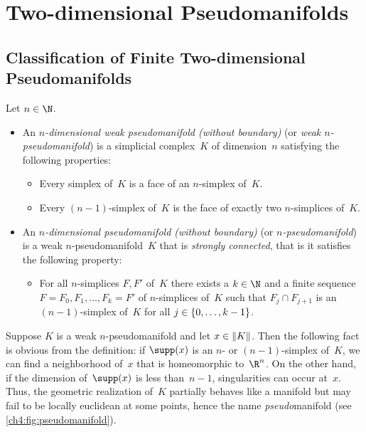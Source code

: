 \chapter{Two-dimensional Pseudomanifolds}
\section{Classification of Finite Two-dimensional Pseudomanifolds}
\begin{thDef}
    \label{ch4:def:pseudomanifold}
    Let $n\in\N$. 
    \begin{itemize}
        \item
            An \emph{$n$-dimensional weak pseudomanifold (without boundary)}
            (or \emph{weak $n$-pseudo\-manifold}) is a simplicial complex~$K$
            of dimension~$n$ satisfying the following properties:
            \begin{itemize}
                \item
                    Every simplex of~$K$ is a face of an $n$-simplex of~$K$.
                \item
                    Every $(n{-}1)$-simplex of~$K$ is the face of exactly two
                    $n$-simplices of~$K$.
            \end{itemize}
            
        \item
            An \emph{$n$-dimensional pseudomanifold (without boundary)} (or
            \emph{$n$-pseudomanifold}) is a weak $n$-pseudomanifold~$K$ that is
            \emph{strongly connected}, that is it satisfies the following
            property:
            \begin{itemize}
                \item
                    For all $n$-simplices $F,F'$ of~$K$ there exists a $k\in\N$ and a
                    finite sequence $F=F_0,F_1,\dots,F_k=F'$ of $n$-simplices of~$K$
                    such that  $F_j\cap F_{j+1}$ is an $(n{-}1)$-simplex of~$K$ 
                    for all $j\in\{0,\ldots,k-1\}$.
            \end{itemize}
    \end{itemize}
\end{thDef}

Suppose $K$ is a weak $n$-pseudomanifold and let $x\in\lVert K\rVert$.
Then the following fact is obvious from the definition:
if $\supp(x)$ is an $n$- or $(n{-}1)$-simplex of~$K$,
we can find a neighborhood of~$x$ that is homeomorphic
to~$\R^n$. On the other hand, if the dimension of~$\supp(x)$
is less than~$n{-}1$, singularities can occur at~$x$.
Thus, the geometric realization of~$K$ partially behaves like a manifold but may
fail to be locally euclidean at some points, hence the name \emph{pseudo}manifold
(see \cref{ch4:fig:pseudomanifold}).

